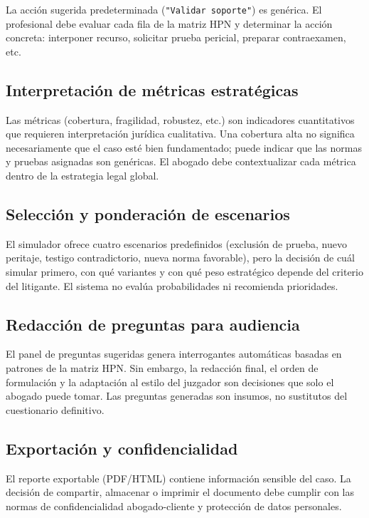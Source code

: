 \documentclass[12pt, letterpaper]{article}
\begin{document}
La acción sugerida predeterminada (\texttt{"Validar soporte"}) es
genérica. El profesional debe evaluar cada fila de la matriz HPN y
determinar la acción concreta: interponer recurso, solicitar prueba
pericial, preparar contraexamen, etc.

\subsection{Interpretación de métricas estratégicas}

Las métricas (cobertura, fragilidad, robustez, etc.) son indicadores
cuantitativos que requieren interpretación jurídica cualitativa. Una
cobertura alta no significa necesariamente que el caso esté bien
fundamentado; puede indicar que las normas y pruebas asignadas son
genéricas. El abogado debe contextualizar cada métrica dentro de la
estrategia legal global.

\subsection{Selección y ponderación de escenarios}

El simulador ofrece cuatro escenarios predefinidos (exclusión de
prueba, nuevo peritaje, testigo contradictorio, nueva norma
favorable), pero la decisión de cuál simular primero, con qué
variantes y con qué peso estratégico depende del criterio del
litigante. El sistema no evalúa probabilidades ni recomienda
prioridades.

\subsection{Redacción de preguntas para audiencia}

El panel de preguntas sugeridas genera interrogantes automáticas
basadas en patrones de la matriz HPN. Sin embargo, la redacción
final, el orden de formulación y la adaptación al estilo del
juzgador son decisiones que solo el abogado puede tomar. Las
preguntas generadas son insumos, no sustitutos del cuestionario
definitivo.

\subsection{Exportación y confidencialidad}

El reporte exportable (PDF/HTML) contiene información sensible del
caso. La decisión de compartir, almacenar o imprimir el documento
debe cumplir con las normas de confidencialidad abogado-cliente y
protección de datos personales.
\end{document}
